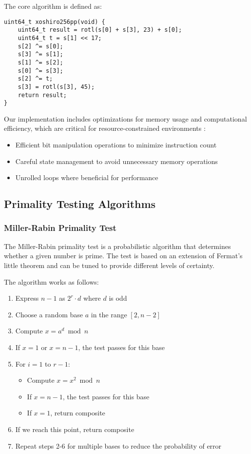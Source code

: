 The core algorithm is defined as:

\begin{verbatim}
uint64_t xoshiro256pp(void) {
    uint64_t result = rotl(s[0] + s[3], 23) + s[0];
    uint64_t t = s[1] << 17;
    s[2] ^= s[0];
    s[3] ^= s[1];
    s[1] ^= s[2];
    s[0] ^= s[3];
    s[2] ^= t;
    s[3] = rotl(s[3], 45);
    return result;
}
\end{verbatim}

Our implementation includes optimizations for memory usage and computational efficiency, which are critical for resource-constrained environments \cite{embedded_benchmarking}:
\begin{itemize}
    \item Efficient bit manipulation operations to minimize instruction count
    \item Careful state management to avoid unnecessary memory operations
    \item Unrolled loops where beneficial for performance
\end{itemize}

\subsection{Primality Testing Algorithms}

\subsubsection{Miller-Rabin Primality Test}
The Miller-Rabin primality test is a probabilistic algorithm that determines whether a given number is prime. The test is based on an extension of Fermat's little theorem and can be tuned to provide different levels of certainty.

The algorithm works as follows:
\begin{enumerate}
    \item Express $n - 1$ as $2^r \cdot d$ where $d$ is odd
    \item Choose a random base $a$ in the range $[2, n-2]$
    \item Compute $x = a^d \bmod n$
    \item If $x = 1$ or $x = n-1$, the test passes for this base
    \item For $i = 1$ to $r-1$:
    \begin{itemize}
        \item Compute $x = x^2 \bmod n$
        \item If $x = n-1$, the test passes for this base
        \item If $x = 1$, return composite
    \end{itemize}
    \item If we reach this point, return composite
    \item Repeat steps 2-6 for multiple bases to reduce the probability of error
\end{enumerate}

